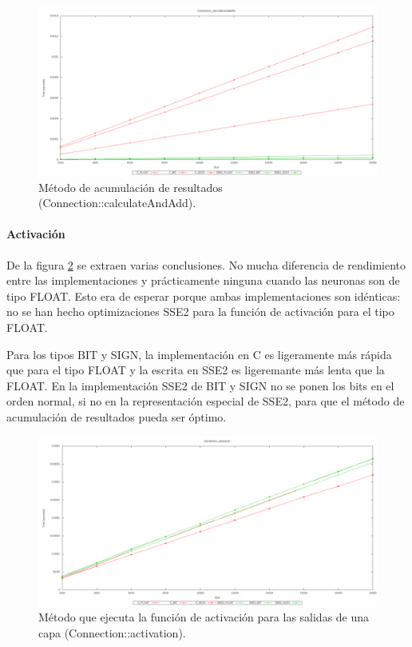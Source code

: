 \documentclass[11pt]{article}
\begin{document}
\begin{titlepage}
\begin{figure}[htb]
\centering
\includegraphics[width=\textwidth]{./img/Connection_calculateAndAddTo.png}
\caption{\label{grafImplCalculate}Método de acumulación de resultados (Connection::calculateAndAdd).}
\end{figure}
\newpage
\paragraph{Activación}
\label{sec-6-1-1-2}


De la figura \ref{grafImplActivation} se extraen varias conclusiones. No mucha diferencia de rendimiento entre las implementaciones y prácticamente ninguna cuando las neuronas son de tipo FLOAT. Esto era de esperar porque ambas implementaciones son idénticas: no se han hecho optimizaciones SSE2 para la función de activación para el tipo FLOAT.

Para los tipos BIT y SIGN, la implementación en C es ligeramente más rápida que para el tipo FLOAT y la  escrita en SSE2 es ligeremante más lenta que la FLOAT. En la implementación SSE2 de BIT y SIGN no se ponen los bits en el orden normal, si no en la representación especial de SSE2, para que el método de acumulación de resultados pueda ser óptimo.

\begin{figure}[htb]
\centering
\includegraphics[width=\textwidth]{./img/Connection_activation.png}
\caption{\label{grafImplActivation}Método que ejecuta la función de activación para las salidas de una capa (Connection::activation).}
\end{figure}
\newpage

\end{titlepage}
\end{document}
